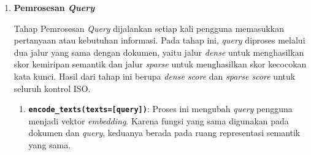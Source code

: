 \begin{enumerate}
\begin{enumerate}[label=\alph*., leftmargin=1.1cm]
\item {\footnotesize\textbf{\texttt{tokenize(text=control\_text)}}}: Proses ini mengubah representasi teks dokumen menjadi daftar token leksikal. Tokenisasi dilakukan dengan mengubah teks menjadi huruf kecil dan mengambil karakter alfanumerik agar dokumen siap diproses oleh BM25.

\item {\footnotesize\textbf{\texttt{BM25Retriever(documents=control\_texts)}}}: Proses ini menginisialisasi indeks BM25 berdasarkan seluruh teks kontrol ISO. Inisialisasi ini membentuk struktur data yang diperlukan untuk menghitung kecocokan kata kunci antara \textit{query} dan dokumen.

\item {\footnotesize\textbf{\texttt{\_compute\_doc\_freq(tokenized\_docs)}}}: Proses ini menghitung jumlah dokumen yang mengandung setiap \textit{term}. Nilai \textit{document frequency} digunakan sebagai dasar untuk menentukan seberapa umum atau spesifik suatu \textit{term} dalam korpus.

\item {\footnotesize\textbf{\texttt{\_compute\_idf(doc\_freq)}}}: Proses ini menghitung nilai \textit{inverse document frequency} untuk setiap \textit{term}. Nilai IDF memberi bobot lebih tinggi pada \textit{term} yang lebih jarang muncul sehingga dokumen dengan kata kunci spesifik dapat diberi skor lebih relevan.

\item {\footnotesize\textbf{\texttt{BM25 index}}}: Proses ini menyimpan informasi \textit{term frequency}, panjang dokumen, rata-rata panjang dokumen, dan IDF. Informasi tersebut digunakan kembali pada tahap Pemrosesan \textit{Query} untuk menghitung \textit{sparse score}.
\end{enumerate}

\item \textbf{Pemrosesan \textit{Query}}

Tahap Pemrosesan \textit{Query} dijalankan setiap kali pengguna memasukkan pertanyaan atau kebutuhan informasi. Pada tahap ini, \textit{query} diproses melalui dua jalur yang sama dengan dokumen, yaitu jalur \textit{dense} untuk menghasilkan skor kemiripan semantik dan jalur \textit{sparse} untuk menghasilkan skor kecocokan kata kunci. Hasil dari tahap ini berupa \textit{dense score} dan \textit{sparse score} untuk seluruh kontrol ISO.

\begin{enumerate}[label=\alph*., leftmargin=1.1cm]
\item {\footnotesize\textbf{\texttt{encode\_texts(texts=[query])}}}: Proses ini mengubah \textit{query} pengguna menjadi vektor \textit{embedding}. Karena fungsi yang sama digunakan pada dokumen dan \textit{query}, keduanya berada pada ruang representasi semantik yang sama.


\end{enumerate}
\end{enumerate}
